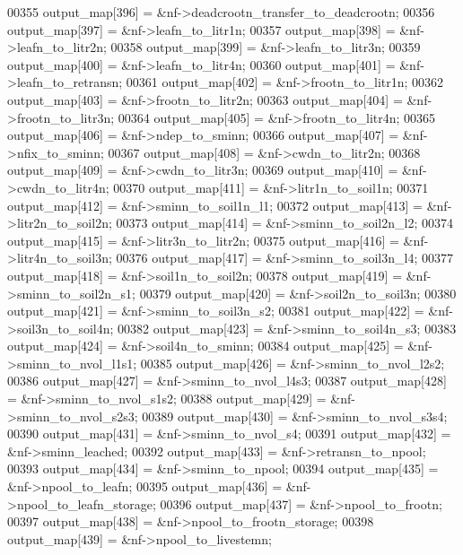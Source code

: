 \begin{DoxyCode}
00355         output\_map[396] = &nf->deadcrootn\_transfer\_to\_deadcrootn;
00356         output\_map[397] = &nf->leafn\_to\_litr1n;
00357         output\_map[398] = &nf->leafn\_to\_litr2n;
00358         output\_map[399] = &nf->leafn\_to\_litr3n;
00359         output\_map[400] = &nf->leafn\_to\_litr4n;
00360         output\_map[401] = &nf->leafn\_to\_retransn;
00361         output\_map[402] = &nf->frootn\_to\_litr1n;
00362         output\_map[403] = &nf->frootn\_to\_litr2n;
00363         output\_map[404] = &nf->frootn\_to\_litr3n;
00364         output\_map[405] = &nf->frootn\_to\_litr4n;
00365         output\_map[406] = &nf->ndep\_to\_sminn;
00366         output\_map[407] = &nf->nfix\_to\_sminn;
00367         output\_map[408] = &nf->cwdn\_to\_litr2n;
00368         output\_map[409] = &nf->cwdn\_to\_litr3n;
00369         output\_map[410] = &nf->cwdn\_to\_litr4n;
00370         output\_map[411] = &nf->litr1n\_to\_soil1n;
00371         output\_map[412] = &nf->sminn\_to\_soil1n\_l1;
00372         output\_map[413] = &nf->litr2n\_to\_soil2n;
00373         output\_map[414] = &nf->sminn\_to\_soil2n\_l2;
00374         output\_map[415] = &nf->litr3n\_to\_litr2n;
00375         output\_map[416] = &nf->litr4n\_to\_soil3n;
00376         output\_map[417] = &nf->sminn\_to\_soil3n\_l4;
00377         output\_map[418] = &nf->soil1n\_to\_soil2n;
00378         output\_map[419] = &nf->sminn\_to\_soil2n\_s1;
00379         output\_map[420] = &nf->soil2n\_to\_soil3n;
00380         output\_map[421] = &nf->sminn\_to\_soil3n\_s2;
00381         output\_map[422] = &nf->soil3n\_to\_soil4n;
00382         output\_map[423] = &nf->sminn\_to\_soil4n\_s3;
00383         output\_map[424] = &nf->soil4n\_to\_sminn;
00384         output\_map[425] = &nf->sminn\_to\_nvol\_l1s1;
00385         output\_map[426] = &nf->sminn\_to\_nvol\_l2s2;
00386         output\_map[427] = &nf->sminn\_to\_nvol\_l4s3;
00387         output\_map[428] = &nf->sminn\_to\_nvol\_s1s2;
00388         output\_map[429] = &nf->sminn\_to\_nvol\_s2s3;
00389         output\_map[430] = &nf->sminn\_to\_nvol\_s3s4;
00390         output\_map[431] = &nf->sminn\_to\_nvol\_s4;
00391         output\_map[432] = &nf->sminn\_leached;
00392         output\_map[433] = &nf->retransn\_to\_npool;
00393         output\_map[434] = &nf->sminn\_to\_npool;
00394         output\_map[435] = &nf->npool\_to\_leafn;
00395         output\_map[436] = &nf->npool\_to\_leafn\_storage;
00396         output\_map[437] = &nf->npool\_to\_frootn;
00397         output\_map[438] = &nf->npool\_to\_frootn\_storage;
00398         output\_map[439] = &nf->npool\_to\_livestemn;

\end{DoxyCode}

